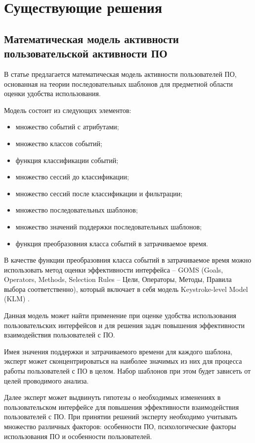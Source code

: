 \chapter{Существующие решения}

\section{Математическая модель активности пользовательской активности ПО}
В статье \cite{7} предлагается математическая модель активности пользователей ПО, основанная на теории последовательных шаблонов для предметной области оценки удобства использования.

Модель состоит из следующих элементов:
\begin{itemize}
	\item множество событий с атрибутами;
	\item множество классов событий;
	\item функция классификации событий;
	\item множество сессий до классификации;
	\item множество сессий после классификации и фильтрации;
	\item множество последовательных шаблонов;
	\item множество значений поддержки последовательных шаблонов;
	\item функция преобразовния класса событий в затрачиваемое время.
\end{itemize}

В качестве функции преобразовния класса событий в затрачиваемое время можно использовать метод оценки эффективности интерфейса – GOMS (Goals, Operators, Methods, Selection Rules – Цели, Операторы, Методы, Правила выбора соответственно), который включает в себя модель Keystroke-level Model (KLM) \cite{8}.

Данная модель может найти применение при оценке удобства использования пользовательских интерфейсов и для решения задач повышения эффективности взаимодействия пользователей с ПО.

Имея значения поддержки и затрачиваемого времени для каждого шаблона, эксперт может сконцентрироваться на наиболее значимых из них
для процесса работы пользователей с ПО в целом. Набор шаблонов при этом будет зависеть от целей проводимого анализа.

Далее эксперт может выдвинуть гипотезы о необходимых изменениях в пользовательском интерфейсе для повышения эффективности взаимодействия пользователей с ПО. При принятии решений эксперту необходимо учитывать множество различных факторов: особенности ПО, психологические факторы использования ПО и особенности пользователей.

